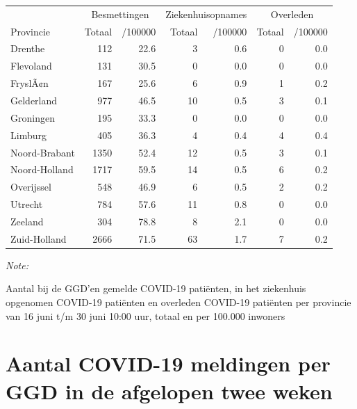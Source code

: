 \documentclass[
  english,
  man,floatsintext]{apa6}
\begin{document}
\begin{table}
\centering
\begin{threeparttable}
\begin{tabular}{lrrrrrr}
\toprule
\multicolumn{1}{c}{ } & \multicolumn{2}{c}{Besmettingen} & \multicolumn{2}{c}{Ziekenhuisopnames} & \multicolumn{2}{c}{Overleden} \\
\cmidrule(l{3pt}r{3pt}){2-3} \cmidrule(l{3pt}r{3pt}){4-5} \cmidrule(l{3pt}r{3pt}){6-7}
Provincie & Totaal & /100000 & Totaal & /100000 & Totaal & /100000\\
\midrule
Drenthe & 112 & 22.6 & 3 & 0.6 & 0 & 0.0\\
Flevoland & 131 & 30.5 & 0 & 0.0 & 0 & 0.0\\
FryslÃ¢n & 167 & 25.6 & 6 & 0.9 & 1 & 0.2\\
Gelderland & 977 & 46.5 & 10 & 0.5 & 3 & 0.1\\
Groningen & 195 & 33.3 & 0 & 0.0 & 0 & 0.0\\
Limburg & 405 & 36.3 & 4 & 0.4 & 4 & 0.4\\
Noord-Brabant & 1350 & 52.4 & 12 & 0.5 & 3 & 0.1\\
Noord-Holland & 1717 & 59.5 & 14 & 0.5 & 6 & 0.2\\
Overijssel & 548 & 46.9 & 6 & 0.5 & 2 & 0.2\\
Utrecht & 784 & 57.6 & 11 & 0.8 & 0 & 0.0\\
Zeeland & 304 & 78.8 & 8 & 2.1 & 0 & 0.0\\
Zuid-Holland & 2666 & 71.5 & 63 & 1.7 & 7 & 0.2\\
\bottomrule
\end{tabular}
\begin{tablenotes}
\item \textit{Note: } 
\item Aantal bij de GGD’en gemelde COVID-19 patiënten, in het ziekenhuis opgenomen COVID-19 patiënten en overleden COVID-19 patiënten per provincie van 16 juni t/m 30 juni 10:00 uur, totaal en per 100.000 inwoners
\end{tablenotes}
\end{threeparttable}
\end{table}

\newpage

\hypertarget{aantal-covid-19-meldingen-per-ggd-in-de-afgelopen-twee-weken}{%
\section{Aantal COVID-19 meldingen per GGD in de afgelopen twee weken}\label{aantal-covid-19-meldingen-per-ggd-in-de-afgelopen-twee-weken}}
\end{document}
